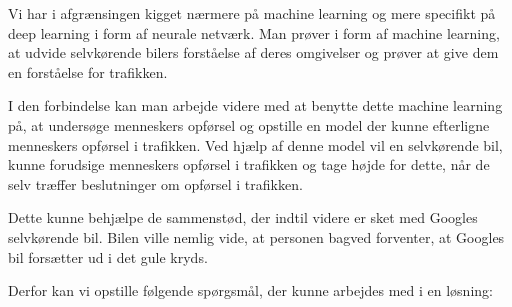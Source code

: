 Vi har i afgrænsingen kigget nærmere på machine learning og mere specifikt på deep learning i form af neurale netværk. Man prøver i form af machine learning, at udvide selvkørende bilers forståelse af deres omgivelser og prøver at give dem en forståelse for trafikken. 

I den forbindelse kan man arbejde videre med at benytte dette machine learning på, at undersøge menneskers opførsel og opstille en model der kunne efterligne menneskers opførsel i trafikken. Ved hjælp af denne model vil en selvkørende bil, kunne forudsige menneskers opførsel i trafikken og tage højde for dette, når de selv træffer beslutninger om opførsel i trafikken. 

Dette kunne behjælpe de sammenstød, der indtil videre er sket med Googles selvkørende bil. Bilen ville nemlig vide, at personen bagved forventer, at Googles bil forsætter ud i det gule kryds.

Derfor kan vi opstille følgende spørgsmål, der kunne arbejdes med i en løsning:


\vspace{10 mm}
\noindent{}
